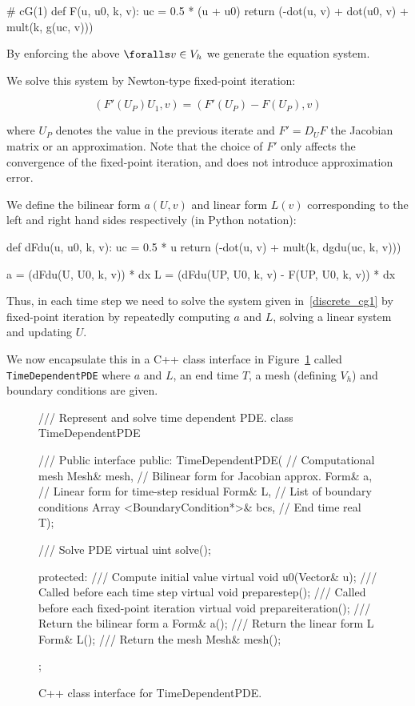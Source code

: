 \begin{python}
# cG(1)
def F(u, u0, k, v):
    uc = 0.5 * (u + u0)
    return (-dot(u, v) + dot(u0, v) + mult(k, g(uc, v)))
\end{python}

By enforcing the above $\foralls v \in V_h$ we generate the equation system.

We solve this system by Newton-type fixed-point iteration:

\begin{equation}
(F'(U_P) U_1, v) = (F'(U_P) - F(U_P), v)
\label{discrete_cg1}
\end{equation}

where $U_P$ denotes the value in the previous iterate and $F' = D_U F$
the Jacobian matrix or an approximation. Note that the choice of $F'$
only affects the convergence of the fixed-point iteration, and does
not introduce approximation error.

We define the bilinear form $a(U, v)$ and linear form $L(v)$
corresponding to the left and right hand sides respectively (in Python
notation):


{\small
\begin{python}
def dFdu(u, u0, k, v):
    uc = 0.5 * u
    return (-dot(u, v) + mult(k, dgdu(uc, k, v)))

a = (dFdu(U, U0, k, v)) * dx
L = (dFdu(UP, U0, k, v) - F(UP, U0, k, v)) * dx
\end{python}
}

Thus, in each time step we need to solve the system given in~\eqref{discrete_cg1} by fixed-point iteration by repeatedly
computing $a$ and $L$, solving a linear system and updating $U$.

We now encapsulate this in a C++ class interface in
Figure~\ref{code:TimeDependentPDE} called {\tt TimeDependentPDE} where
$a$ and $L$, an end time $T$, a mesh (defining $V_h$) and
boundary conditions are given.



\begin{figure}[!h]
\begin{c++}
/// Represent and solve time dependent PDE.
class TimeDependentPDE
{
  /// Public interface
public:
  TimeDependentPDE(
   // Computational mesh
   Mesh& mesh,
   // Bilinear form for Jacobian approx.
   Form& a,
   // Linear form for time-step residual
   Form& L,
   // List of boundary conditions
   Array <BoundaryCondition*>& bcs,
   // End time
   real T);

  /// Solve PDE
  virtual uint solve();

protected:
  /// Compute initial value
  virtual void u0(Vector& u);
  /// Called before each time step
  virtual void preparestep();
  /// Called before each fixed-point iteration
  virtual void prepareiteration();
  /// Return the bilinear form a
  Form& a();
  /// Return the linear form L
  Form& L();
  /// Return the mesh
  Mesh& mesh();
};
\end{c++}
\caption{
C++ class interface for TimeDependentPDE.
}
\label{code:TimeDependentPDE}
\end{figure}


